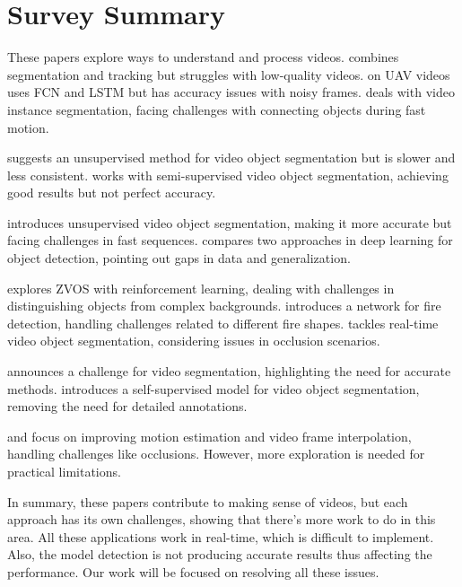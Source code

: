 \begin{enumerate}
         
\end{enumerate}

\newpage

\section{Survey Summary}

\noindent
These papers explore ways to understand and process videos. \cite{main_paper} combines segmentation and tracking but struggles with low-quality videos. \cite{1} on UAV videos uses FCN and LSTM but has accuracy issues with noisy frames. \cite{2} deals with video instance segmentation, facing challenges with connecting objects during fast motion.

\noindent
\cite{9} suggests an unsupervised method for video object segmentation but is slower and less consistent. \cite{5} works with semi-supervised video object segmentation, achieving good results but not perfect accuracy.

\noindent
\cite{10} introduces unsupervised video object segmentation, making it more accurate but facing challenges in fast sequences. \cite{11} compares two approaches in deep learning for object detection, pointing out gaps in data and generalization.

\noindent
\cite{12} explores ZVOS with reinforcement learning, dealing with challenges in distinguishing objects from complex backgrounds. \cite{13} introduces a network for fire detection, handling challenges related to different fire shapes. \cite{14} tackles real-time video object segmentation, considering issues in occlusion scenarios.

\noindent
\cite{3} announces a challenge for video segmentation, highlighting the need for accurate methods. \cite{6} introduces a self-supervised model for video object segmentation, removing the need for detailed annotations.

\noindent
\cite{7} and \cite{8} focus on improving motion estimation and video frame interpolation, handling challenges like occlusions. However, more exploration is needed for practical limitations.

\noindent
In summary, these papers contribute to making sense of videos, but each approach has its own challenges, showing that there's more work to do in this area. All these applications work in real-time, which is difficult to implement. Also, the model detection is not producing accurate results thus affecting the performance. Our work will be focused on resolving all these issues.






